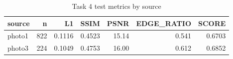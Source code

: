 \begin{table}[t]
\centering
\caption{Task 4 test metrics by source}
\label{tab:task4-by_source}
\begin{tabular}{lrrrrrr}
\toprule
source & n & L1 & SSIM & PSNR & EDGE_RATIO & SCORE \\
\midrule
photo1 & 822 & 0.1116 & 0.4523 & 15.14 & 0.541 & 0.6703 \\
photo3 & 224 & 0.1049 & 0.4753 & 16.00 & 0.612 & 0.6852 \\
\bottomrule
\end{tabular}
\end{table}
